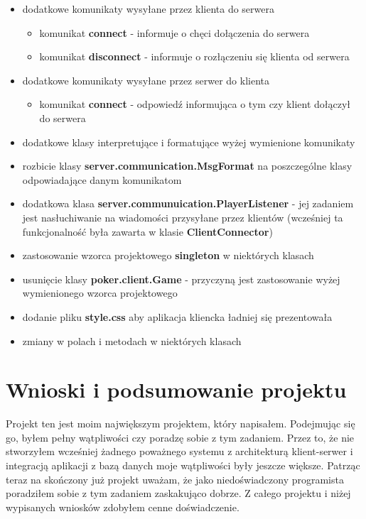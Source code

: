 \documentclass{article}
\begin{document}
    \begin{itemize}
        \item dodatkowe komunikaty wysyłane przez klienta do serwera
        \begin{itemize}
            \item komunikat \textbf{connect} - informuje o chęci dołączenia do serwera
            \item komunikat \textbf{disconnect} - informuje o rozłączeniu się klienta od serwera
        \end{itemize}
        \item dodatkowe komunikaty wysyłane przez serwer do klienta
        \begin{itemize}
            \item komunikat \textbf{connect} - odpowiedź informująca o tym czy klient dołączył do serwera
        \end{itemize}
        \item dodatkowe klasy interpretujące i formatujące wyżej wymienione komunikaty
        \item rozbicie klasy \textbf{server.communication.MsgFormat} na poszczególne klasy odpowiadające danym komunikatom
        \item dodatkowa klasa \textbf{server.communuication.PlayerListener} - jej zadaniem jest nasłuchiwanie na wiadomości przysyłane przez klientów (wcześniej ta funkcjonalność była zawarta w klasie \textbf{ClientConnector})
        \item zastosowanie wzorca projektowego \textbf{singleton} w niektórych klasach
        \item usunięcie klasy \textbf{poker.client.Game} - przyczyną jest zastosowanie wyżej wymienionego wzorca projektowego
        \item dodanie pliku \textbf{style.css} aby aplikacja kliencka ładniej się prezentowała
        \item zmiany w polach i metodach w niektórych klasach
    \end{itemize}


\section{Wnioski i podsumowanie projektu}
    Projekt ten jest moim największym projektem, który napisałem.
    Podejmując się go, byłem pełny wątpliwości czy poradzę sobie z tym zadaniem.
    Przez to, że nie stworzyłem wcześniej żadnego poważnego systemu z architekturą klient-serwer i integracją aplikacji z bazą danych moje wątpliwości były jeszcze większe.
    Patrząc teraz na skończony już projekt uważam, że jako niedoświadczony programista poradziłem sobie z tym zadaniem zaskakująco dobrze.
    Z całego projektu i niżej wypisanych wniosków zdobyłem cenne doświadczenie.
    
\end{document}
